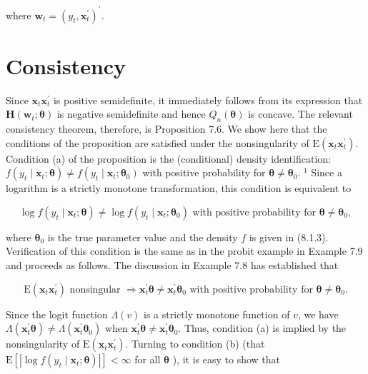 \documentclass[10pt]{article}
\begin{document}
where $\mathbf{w}_{t}=\left(y_{t}, \mathbf{x}_{t}^{\prime}\right)^{\prime}$.

\section*{Consistency}
Since $\mathbf{x}_{t} \mathbf{x}_{t}^{\prime}$ is positive semidefinite, it immediately follows from its expression that $\mathbf{H}\left(\mathbf{w}_{t} ; \boldsymbol{\theta}\right)$ is negative semidefinite and hence $Q_{n}(\boldsymbol{\theta})$ is concave. The relevant consistency theorem, therefore, is Proposition 7.6. We show here that the conditions of the proposition are satisfied under the nonsingularity of $\mathrm{E}\left(\mathbf{x}_{t} \mathbf{x}_{t}^{\prime}\right)$. Condition (a) of the proposition is the (conditional) density identification: $f\left(y_{t} \mid \mathbf{x}_{t} ; \boldsymbol{\theta}\right) \neq f\left(y_{t} \mid\right. \left.\mathbf{x}_{t} ; \boldsymbol{\theta}_{0}\right)$ with positive probability for $\boldsymbol{\theta} \neq \boldsymbol{\theta}_{0}$. ${ }^{1}$ Since a logarithm is a strictly monotone transformation, this condition is equivalent to


\begin{equation*}
\log f\left(y_{t} \mid \mathbf{x}_{t} ; \boldsymbol{\theta}\right) \neq \log f\left(y_{t} \mid \mathbf{x}_{t} ; \boldsymbol{\theta}_{0}\right) \text { with positive probability for } \boldsymbol{\theta} \neq \boldsymbol{\theta}_{0}, \tag{8.1.9}
\end{equation*}


where $\boldsymbol{\theta}_{0}$ is the true parameter value and the density $f$ is given in (8.1.3). Verification of this condition is the same as in the probit example in Example 7.9 and proceeds as follows. The discussion in Example 7.8 has established that


\begin{equation*}
\mathrm{E}\left(\mathbf{x}_{t} \mathbf{x}_{t}^{\prime}\right) \text { nonsingular } \Rightarrow \mathbf{x}_{t}^{\prime} \boldsymbol{\theta} \neq \mathbf{x}_{t}^{\prime} \boldsymbol{\theta}_{0} \text { with positive probability for } \boldsymbol{\theta} \neq \boldsymbol{\theta}_{0} . \tag{8.1.10}
\end{equation*}


Since the logit function $\Lambda(v)$ is a strictly monotone function of $v$, we have $\Lambda\left(\mathbf{x}_{t}^{\prime} \boldsymbol{\theta}\right) \neq \Lambda\left(\mathbf{x}_{t}^{\prime} \boldsymbol{\theta}_{0}\right)$ when $\mathbf{x}_{t}^{\prime} \boldsymbol{\theta} \neq \mathbf{x}_{t}^{\prime} \boldsymbol{\theta}_{0}$. Thus, condition (a) is implied by the nonsingularity of $\mathrm{E}\left(\mathbf{x}_{t} \mathbf{x}_{t}^{\prime}\right)$. Turning to condition (b) (that $\mathrm{E}\left[\left|\log f\left(y_{t} \mid \mathbf{x}_{t} ; \boldsymbol{\theta}\right)\right|\right]<\infty$ for all $\boldsymbol{\theta}$ ), it is easy to show that
\end{document}
